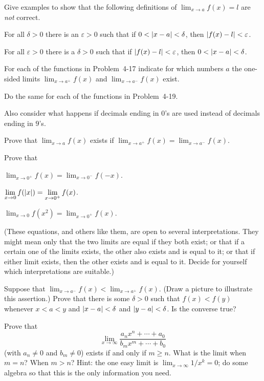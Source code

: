 Give examples to show that the following definitions of
$\lim_{x\to a}f(x)=l$ are \emph{not} correct.
\begin{letters}
\item For all $\delta>0$ there is an $\varepsilon>0$ such that if
$0<\lvert x-a\rvert<\delta$, then $\lvert f(x)-l\rvert<\varepsilon$.
\item For all $\varepsilon>0$ there is a $\delta>0$ such that if
$\lvert f(x)-l\rvert<\varepsilon$, then $0<\lvert x-a\rvert<\delta$.
\end{letters}

For each of the functions in Problem~4-17 indicate for which numbers $a$ the
one-sided limits $\lim_{x\to a^+}f(x)$ and $\lim_{x\to a^-}f(x)$ exist.

\begin{letters}
\item Do the same for each of the functions in Problem~4-19.
\item Also consider what happens if decimals ending in $0$'s are used instead
of decimals ending in $9$'s.
\end{letters}

Prove that $\lim_{x\to a}f(x)$ exists if
$\lim_{x\to a^+}f(x)=\lim_{x\to a^-}f(x)$.

Prove that
\begin{romans}
\item $\displaystyle\lim_{x\to 0^+}f(x)=\lim_{x\to 0^-}f(-x)$.
\item $\displaystyle\lim_{x\to 0}f(\lvert x\rvert)=\lim_{x\to 0^+}f(x)$.
\item $\displaystyle\lim_{x\to 0}f(x^2)=\lim_{x\to 0^+}f(x)$.
\end{romans}
(These equations, and others like them, are open to several interpretations.
They might mean only that the two limits are equal if they both exist; or that
if a certain one of the limits exists, the other also exists and is equal to
it; or that if either limit exists, then the other exists and is equal to it.
Decide for yourself which interpretations are suitable.)

Suppose that $\lim_{x\to a^-}f(x)<\lim_{x\to a^+}f(x)$. (Draw a picture to
illustrate this assertion.) Prove that there is some $\delta>0$ such that
$f(x)<f(y)$ whenever $x<a<y$ and $\lvert x-a\rvert<\delta$ and $\lvert y-a\rvert<\delta$.
Is the converse true?

Prove that
\[
\lim_{x\to\infty}\frac{a_n x^n+\cdots+a_0}{b_m x^m+\cdots+b_0}
\]
(with $a_n\neq 0$ and $b_m\neq 0$) exists if and only if $m\geq n$. What is
the limit when $m=n$? When $m>n$? Hint: the one easy limit is
$\lim_{x\to\infty}1/x^k=0$; do some algebra so that this is the only
information you need.

